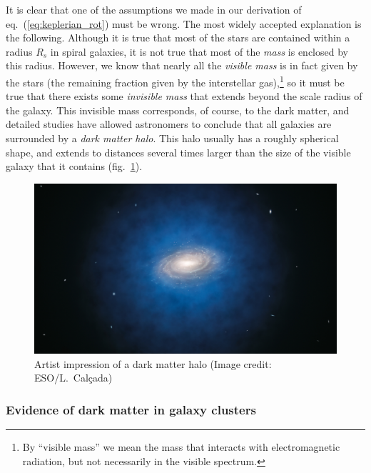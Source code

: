 \documentclass[11pt, a4paper,oneside,openright]{book}
\numberwithin{equation}{section}
\begin{document}
It is clear that one of the assumptions we made in our derivation of eq.\ (\ref{eq:keplerian_rot}) must be wrong. The most widely accepted explanation is the following. Although it is true that most of the stars are contained within a radius $R_s$ in spiral galaxies, it is not true that most of the {\it mass} is enclosed by this radius. However, we know that nearly all the {\it visible mass} is in fact given by the stars (the remaining fraction given by the interstellar gas),\footnote{By ``visible mass'' we mean the mass that interacts with electromagnetic radiation, but not necessarily in the visible spectrum.} so it must be true that there exists some {\it invisible mass} that extends beyond the scale radius of the galaxy. This invisible mass corresponds, of course, to the dark matter, and detailed studies have allowed astronomers to conclude that all galaxies are surrounded by a {\it dark matter halo}. This halo usually has a roughly spherical shape, and extends to distances several times larger than the 
size of the visible galaxy that it contains (fig.\ \ref{fig:lec10_5}).
\begin{figure}[ht]
\begin{center}
\includegraphics[scale=0.4]{Draw/lec10_5.png}
\end{center}
\caption{Artist impression of a dark matter halo (Image credit: ESO/L.\ Cal\c{c}ada)}
\label{fig:lec10_5}
\end{figure}

\subsubsection{Evidence of dark matter in galaxy clusters}
\end{document}
